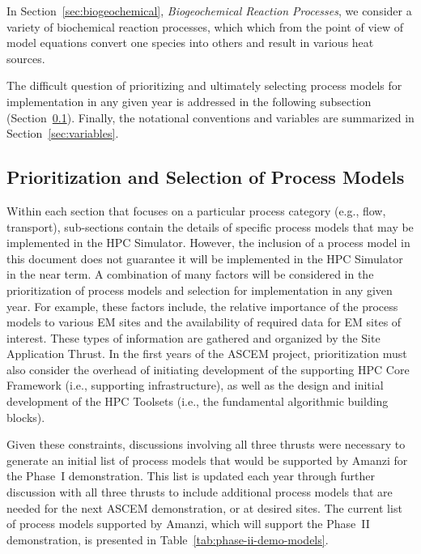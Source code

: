 In Section~\ref{sec:biogeochemical}, \emph{Biogeochemical Reaction Processes},
we consider a variety of biochemical reaction processes,
which which from the point of view of model equations
convert one species into others and result in various heat sources.
  

The difficult question of prioritizing and ultimately selecting process
models for implementation in any given year is addressed in the
following subsection (Section~\ref{sec:selecting-process-models}).
Finally, the notational conventions and variables are summarized in
Section~\ref{sec:variables}.


\subsection{Prioritization and Selection of Process Models}
\label{sec:selecting-process-models}

Within each section that focuses on a particular process category
(e.g., flow, transport), sub-sections contain the details of specific
process models that may be implemented in the HPC Simulator.
However, the inclusion of a process model in this document does not
guarantee it will be implemented in the HPC Simulator in the near
term.  A combination of many factors will be considered in the
prioritization of process models and selection for implementation in
any given year.  For example, these factors include, the relative
importance of the process models to various EM sites and the
availability of required data for EM sites of interest.  These types
of information are gathered and organized by the Site Application
Thrust.  In the first years of the ASCEM project, prioritization must also
consider the overhead of initiating development of the supporting HPC
Core Framework (i.e., supporting infrastructure), as well as the design and 
initial development of the HPC Toolsets (i.e., the fundamental algorithmic
building blocks).

Given these constraints, discussions involving all three thrusts were
necessary to generate an initial list of process models that would be
supported by Amanzi for the Phase~I demonstration. This list is
updated each year through further discussion with all three thrusts to
include additional process models that are needed for the next ASCEM
demonstration, or at desired sites.  The current list of process
models supported by Amanzi, which will support the Phase~II
demonstration, is presented in Table~\ref{tab:phase-ii-demo-models}.

